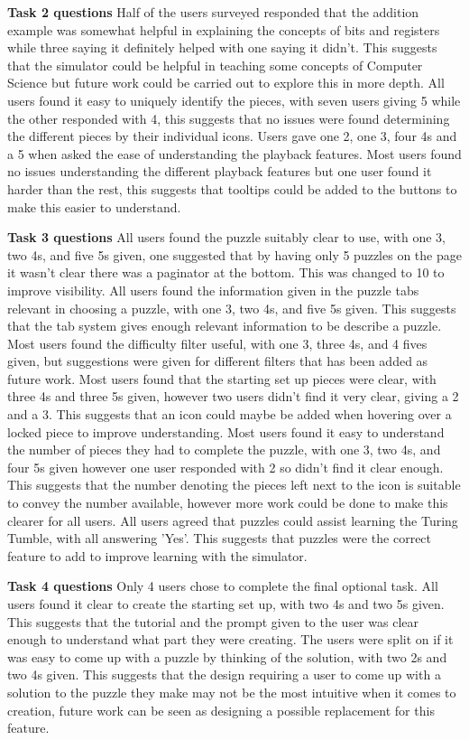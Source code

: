\documentclass{l4proj}
\begin{document}
\textbf{Task 2 questions}
Half of the users surveyed responded that the addition example was somewhat helpful in explaining the concepts of bits and registers while three saying it definitely helped with one saying it didn't. This suggests that the simulator could be helpful in teaching some concepts of Computer Science but future work could be carried out to explore this in more depth. All users found it easy to uniquely identify the pieces, with seven users giving 5 while the other responded with 4, this suggests that no issues were found determining the different pieces by their individual icons. Users gave one 2, one 3, four 4s and a 5 when asked the ease of understanding the playback features. Most users found no issues understanding the different playback features but one user found it harder than the rest, this suggests that tooltips could be added to the buttons to make this easier to understand.   

\textbf{Task 3 questions}
All users found the puzzle suitably clear to use, with one 3, two 4s, and five 5s given, one suggested that by having only 5 puzzles on the page it wasn't clear there was a paginator at the bottom. This was changed to 10 to improve visibility. All users found the information given in the puzzle tabs relevant in choosing a puzzle, with one 3, two 4s, and five 5s given. This suggests that the tab system gives enough relevant information to be describe a puzzle. Most users found the difficulty filter useful, with one 3, three 4s, and 4 fives given, but suggestions were given for different filters that has been added as future work. Most users found that the starting set up pieces were clear, with three 4s and three 5s given, however two users didn't find it very clear, giving a 2 and a 3. This suggests that an icon could maybe be added when hovering over a locked piece to improve understanding. Most users found it easy to understand the number of pieces they had to complete the puzzle, with one 3, two 4s, and four 5s given however one user responded with 2 so didn't find it clear enough. This suggests that the number denoting the pieces left next to the icon is suitable to convey the number available, however more work could be done to make this clearer for all users. All users agreed that puzzles could assist learning the Turing Tumble, with all answering 'Yes'. This suggests that puzzles were the correct feature to add to improve learning with the simulator.

\textbf{Task 4 questions}
Only 4 users chose to complete the final optional task. All users found it clear to create the starting set up, with two 4s and two 5s given. This suggests that the tutorial and the prompt given to the user was clear enough to understand what part they were creating. The users were split on if it was easy to come up with a puzzle by thinking of the solution, with two 2s and two 4s given. This suggests that the design requiring a user to come up with a solution to the puzzle they make may not be the most intuitive when it comes to creation, future work can be seen as designing a possible replacement for this feature.
\end{document}

